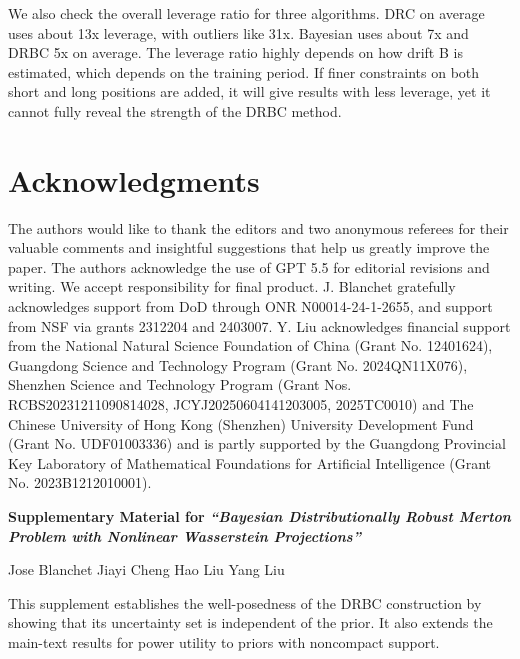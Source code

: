 \documentclass[11pt]{article}
\theoremstyle{definition}
\begin{document}
We also check the overall leverage ratio for three algorithms. DRC on average uses about 13x leverage, with outliers like 31x. Bayesian uses about 7x and DRBC 5x on average. The leverage ratio highly depends on how drift B is estimated, which depends on the training period. If finer constraints on both short and long positions are added, it will give results with less leverage, yet it cannot fully reveal the strength of the DRBC method. 

{
\section*{Acknowledgments}
The authors would like to thank the editors and two anonymous referees for their valuable comments and insightful suggestions that help us greatly improve the paper. The authors acknowledge the use of GPT 5.5 for editorial revisions and writing. We accept responsibility for final product. J. Blanchet gratefully acknowledges support from DoD through ONR N00014-24-1-2655, and support from NSF via grants 2312204 and 2403007. Y. Liu acknowledges financial support from the National Natural Science Foundation of China (Grant No. 12401624), Guangdong Science and Technology Program (Grant No. 2024QN11X076), Shenzhen Science and Technology Program (Grant Nos. RCBS20231211090814028, JCYJ20250604141203005, 2025TC0010) and The Chinese University of Hong Kong (Shenzhen) University Development Fund (Grant No. UDF01003336) and is partly supported by the Guangdong Provincial Key Laboratory of Mathematical Foundations for Artificial Intelligence (Grant No. 2023B1212010001). 
}





\newpage
\appendix
\onecolumn

\begin{center}
{\Large\bfseries Supplementary Material for \textit{``Bayesian Distributionally Robust Merton Problem with Nonlinear Wasserstein Projections''}\par}
\vspace{1em}
Jose Blanchet \quad Jiayi Cheng \quad Hao Liu \quad Yang Liu
\end{center}

This supplement establishes the well-posedness of the DRBC construction by
showing that its uncertainty set is independent of the prior. It also extends
the main-text results for power utility to priors with noncompact support.
\end{document}
